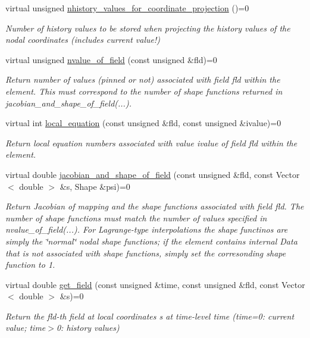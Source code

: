 \begin{DoxyCompactItemize}
virtual unsigned \hyperlink{classoomph_1_1ProjectableElementBase_ab4ecd0cd24000a3ed675dc7198203c1f}{nhistory\+\_\+values\+\_\+for\+\_\+coordinate\+\_\+projection} ()=0
\begin{DoxyCompactList}\small\item\em Number of history values to be stored when projecting the history values of the nodal coordinates (includes current value!) \end{DoxyCompactList}\item 
virtual unsigned \hyperlink{classoomph_1_1ProjectableElementBase_a1a9a6de16f3511bca8e8be770abb9c2e}{nvalue\+\_\+of\+\_\+field} (const unsigned \&fld)=0
\begin{DoxyCompactList}\small\item\em Return number of values (pinned or not) associated with field fld within the element. This must correspond to the number of shape functions returned in jacobian\+\_\+and\+\_\+shape\+\_\+of\+\_\+field(...). \end{DoxyCompactList}\item 
virtual int \hyperlink{classoomph_1_1ProjectableElementBase_ac5c27ae929ff636dc7747fe23fd4f738}{local\+\_\+equation} (const unsigned \&fld, const unsigned \&ivalue)=0
\begin{DoxyCompactList}\small\item\em Return local equation numbers associated with value ivalue of field fld within the element. \end{DoxyCompactList}\item 
virtual double \hyperlink{classoomph_1_1ProjectableElementBase_ad45c21b58c0985d52f68ab2d79cbb488}{jacobian\+\_\+and\+\_\+shape\+\_\+of\+\_\+field} (const unsigned \&fld, const Vector$<$ double $>$ \&s, Shape \&psi)=0
\begin{DoxyCompactList}\small\item\em Return Jacobian of mapping and the shape functions associated with field fld. The number of shape functions must match the number of values specified in nvalue\+\_\+of\+\_\+field(...). For Lagrange-\/type interpolations the shape functinos are simply the \char`\"{}normal\char`\"{} nodal shape functions; if the element contains internal Data that is not associated with shape functions, simply set the corresonding shape function to 1. \end{DoxyCompactList}\item 
virtual double \hyperlink{classoomph_1_1ProjectableElementBase_ae4da5b565b6d333be2f5920f7be763cd}{get\+\_\+field} (const unsigned \&time, const unsigned \&fld, const Vector$<$ double $>$ \&s)=0
\begin{DoxyCompactList}\small\item\em Return the fld-\/th field at local coordinates s at time-\/level time (time=0\+: current value; time$>$0\+: history values) \end{DoxyCompactList}\end{DoxyCompactItemize}
